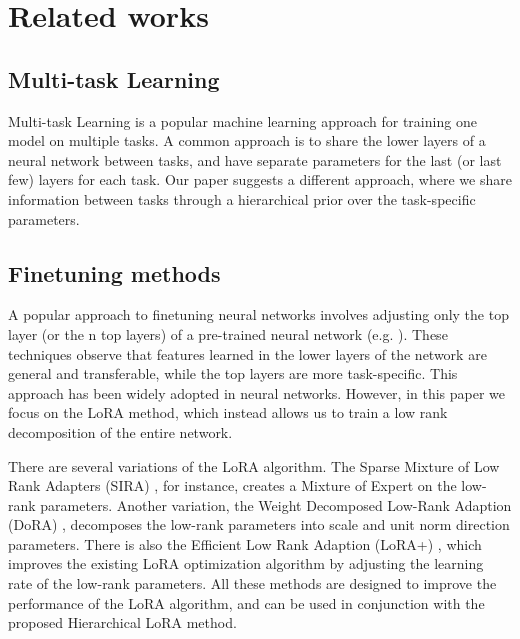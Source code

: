 \documentclass{article}
\begin{document}


\section{Related works} \label{sec:related_works}

\subsection{Multi-task Learning}
Multi-task Learning \cite{caruana_multitask_nodate} is a popular machine learning approach for training one model on multiple tasks. A common approach is to share the lower layers of a neural network between tasks, and have separate parameters for the last (or last few) layers for each task. Our paper suggests a different approach, where we share information between tasks through a hierarchical prior over the task-specific parameters.

\subsection{Finetuning methods}
A popular approach to finetuning neural networks involves adjusting only the top layer (or the n top layers) of a pre-trained neural network (e.g. \cite{yosinski2014transferable}). These techniques observe that features learned in the lower layers of the network are general and transferable, while the top layers are more task-specific. This approach has been widely adopted in neural networks. However, in this paper we focus on the LoRA method, which instead allows us to train a low rank decomposition of the entire network.

There are several variations of the LoRA algorithm. The Sparse Mixture of Low Rank Adapters (SIRA) \cite{zhu_sira_2023}, for instance, creates a Mixture of Expert on the low-rank parameters. Another variation, the Weight Decomposed Low-Rank Adaption (DoRA) \cite{hayou_lora_2024}, decomposes the low-rank parameters into scale and unit norm direction parameters. There is also the Efficient Low Rank Adaption (LoRA+) \cite{hayou_lora_2024}, which improves the existing LoRA optimization algorithm by adjusting the learning rate of the low-rank parameters.
All these methods are designed to improve the performance of the LoRA algorithm, and can be used in conjunction with the proposed Hierarchical LoRA method.
\end{document}
